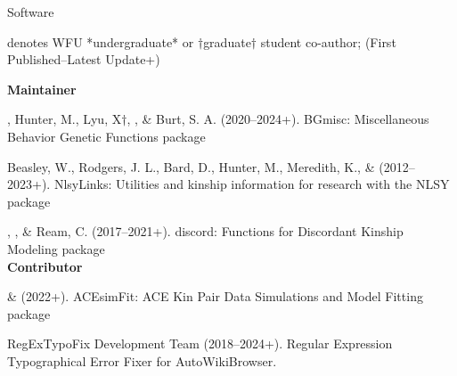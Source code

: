 \begin{rSection}{\textrm{Software}}%
\vspace{-1mm}\begin{center}\footnotesize{denotes WFU *undergraduate* or $\dagger$graduate$\dagger$ student co-author; (First Published–Latest Update+)}\end{center}\vspace{-1mm}

{\large \textbf {Maintainer}}%
\begin{etaremune}
\item\meb, Hunter, M., Lyu, X$\dagger$, \jt, \& Burt, S. A. (2020–2024+). BGmisc: Miscellaneous Behavior Genetic Functions \R package %

\item  Beasley, W., Rodgers, J. L., Bard, D., Hunter, M., Meredith, K., \& \meb  (2012–2023+). NlsyLinks: Utilities and kinship information for research with the NLSY \R package 

\item\meb, \jt, \& Ream, C. (2017–2021+). discord: Functions for Discordant Kinship Modeling \R package 
%
%
\smallskip\\
\hspace*{-8mm}\large{\bf{Contributor}}
\item \xyl  \& \meb (2022+). ACEsimFit: ACE Kin Pair Data Simulations and Model Fitting \R package 


\item RegExTypoFix Development Team (2018–2024+). Regular Expression Typographical Error Fixer for Auto\allowbreak WikiBrowser. 
%
%
%
\end{etaremune}
\end{rSection}
